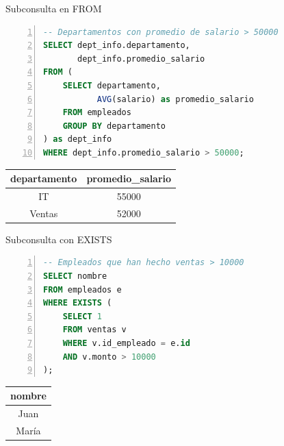 \documentclass{beamer}
\begin{document}
\begin{frame}[fragile]{Subconsulta en FROM}
    \begin{lstlisting}[language=SQL, numbers=left, numbersep=5pt]
-- Departamentos con promedio de salario > 50000
SELECT dept_info.departamento, 
       dept_info.promedio_salario
FROM (
    SELECT departamento, 
           AVG(salario) as promedio_salario
    FROM empleados
    GROUP BY departamento
) as dept_info
WHERE dept_info.promedio_salario > 50000;
    \end{lstlisting}
    
    \vspace{0.3cm}
    
    \begin{center}
        \begin{tabular}{cc}
            \toprule
            departamento & promedio\_salario \\
            \midrule
            IT & 55000 \\
            Ventas & 52000 \\
            \bottomrule
        \end{tabular}
    \end{center}
\end{frame}

\begin{frame}[fragile]{Subconsulta con EXISTS}
    \begin{lstlisting}[language=SQL, numbers=left, numbersep=5pt]
-- Empleados que han hecho ventas > 10000
SELECT nombre
FROM empleados e
WHERE EXISTS (
    SELECT 1 
    FROM ventas v
    WHERE v.id_empleado = e.id 
    AND v.monto > 10000
);
    \end{lstlisting}
    
    \vspace{0.3cm}
    
    \begin{center}
        \begin{tabular}{c}
            \toprule
            nombre \\
            \midrule
            Juan \\
            María \\
            \bottomrule
        \end{tabular}
    \end{center}
\end{frame}
\end{document}
